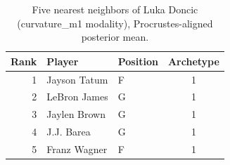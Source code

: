 \begin{table}[htbp]
  \centering\small
  \begin{tabular}{rllc}
    \toprule
    Rank & Player & Position & Archetype \\
    \midrule
    1 & Jayson Tatum & F & 1 \\
    2 & LeBron James & G & 1 \\
    3 & Jaylen Brown & G & 1 \\
    4 & J.J. Barea & G & 1 \\
    5 & Franz Wagner & F & 1 \\
    \bottomrule
  \end{tabular}
  \caption{Five nearest neighbors of Luka Doncic (curvature_m1 modality), Procrustes-aligned posterior mean.}
  \label{tab:Luka_Doncic_neighbors_curvature_m1}
\end{table}

